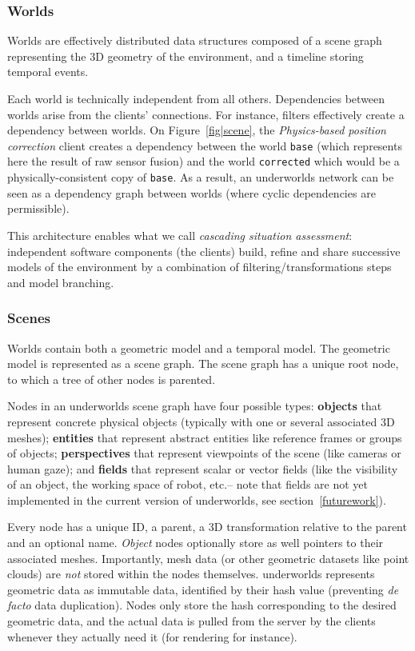 \documentclass[conference]{IEEEtran}
\newcommand{\etc}{etc.\xspace}
\newcommand{\uwds}{{\sc underworlds}\xspace}
\begin{document}
\subsubsection{Worlds}

Worlds are effectively distributed data structures composed of a scene graph
representing the 3D geometry of the environment, and a timeline storing temporal
events.

Each world is technically independent from all others. Dependencies between
worlds arise from the clients' connections. For instance, filters effectively
create a dependency between worlds. On Figure~\ref{fig|scene}, the \textit{Physics-based
position correction} client creates a dependency between the world {\tt base} (which
represents here the result of raw sensor fusion) and the world {\tt corrected}
which would be a physically-consistent copy of {\tt base}.
As a result, an \uwds network can be seen as a dependency graph between worlds (where
cyclic dependencies are permissible).

This architecture enables what we call \emph{cascading situation assessment}:
independent software components (the clients) build, refine and share successive
models of the environment by a combination of filtering/transformations steps
and model branching.

\subsubsection{Scenes}

Worlds contain both a geometric model and a temporal model. The geometric
model is represented as a scene graph. The scene graph has a unique root node,
to which a tree of other nodes is parented.

Nodes in an \uwds scene graph have four possible types: \textbf{objects} that
represent concrete physical objects (typically with one or several associated 3D
meshes); \textbf{entities} that represent abstract entities like reference
frames or groups of objects; \textbf{perspectives} that represent viewpoints
of the scene (like cameras or human gaze); and \textbf{fields} that represent
scalar or vector fields (like the visibility of an object, the working space of
robot, \etc -- note that fields are not yet implemented in the current version
of \uwds, see section~\ref{futurework}).

Every node has a unique ID, a parent, a 3D transformation relative to the parent
and an optional name. \emph{Object} nodes optionally store as well pointers to
their associated meshes. Importantly, mesh data (or other geometric datasets
like point clouds) are \emph{not} stored within the nodes themselves. \uwds
represents geometric data as immutable data, identified by their hash value
(preventing \textit{de facto} data duplication).  Nodes only store the hash
corresponding to the desired geometric data, and the actual data is pulled from
the server by the clients whenever they actually need it (for rendering for
instance).
\end{document}

